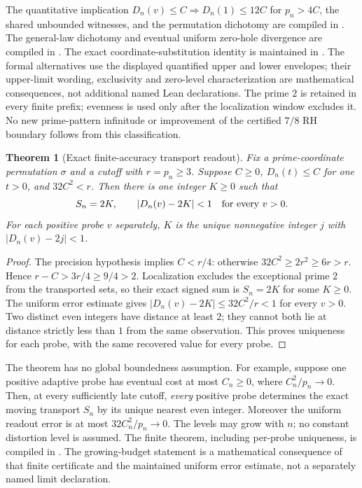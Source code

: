 \documentclass[11pt]{article}
\newtheorem{theorem}{Theorem}[section]
\theoremstyle{definition}
\begin{document}
\begin{flushleft}
The quantitative implication
$D_n(v)\le C\Rightarrow D_n(1)\le12C$ for $p_n>4C$, the shared
unbounded witnesses, and the permutation dichotomy are compiled in
.
The general-law dichotomy and eventual uniform zero-hole divergence are
compiled in .
The exact coordinate-substitution identity is maintained in
.
The formal alternatives use the displayed quantified upper and lower
envelopes; their upper-limit wording, exclusivity and zero-level
characterization are mathematical consequences, not additional named
Lean declarations. The prime $2$ is retained in every finite prefix;
evenness is used only after the localization window excludes it.
No new prime-pattern infinitude or improvement of the certified
$7/8$ RH boundary follows from this classification.
\end{flushleft}

\begin{theorem}[Exact finite-accuracy transport readout]
Fix a prime-coordinate permutation $\sigma$ and a cutoff with $r=p_n\ge3$.
Suppose $C\ge0$, $D_n(t)\le C$ for one $t>0$, and $32C^2<r$.
Then there is one integer $K\ge0$ such that
\[
 S_n=2K,\qquad |D_n(v)-2K|<1\quad\hbox{for every }v>0.
\]
For each positive probe $v$ separately, $K$ is the unique nonnegative
integer $j$ with $|D_n(v)-2j|<1$.
\end{theorem}
\begin{proof}
The precision hypothesis implies $C<r/4$: otherwise
$32C^2\ge2r^2\ge6r>r$. Hence $r-C>3r/4\ge9/4>2$.
Localization excludes the exceptional prime $2$ from the transported
sets, so their exact signed sum is $S_n=2K$ for some $K\ge0$.
The uniform error estimate gives
$|D_n(v)-2K|\le32C^2/r<1$ for every $v>0$.
Two distinct even integers have distance at least $2$; they cannot both
lie at distance strictly less than $1$ from the same observation.
This proves uniqueness for each probe, with the same recovered value
for every probe.
\end{proof}

The theorem has no global boundedness assumption.
For example, suppose one positive adaptive probe has eventual cost at
most $C_n\ge0$, where $C_n^2/p_n\to0$. Then, at every sufficiently late
cutoff, \emph{every} positive probe determines the exact moving transport
$S_n$ by its unique nearest even integer. Moreover the uniform readout
error is at most $32C_n^2/p_n\to0$.
The levels may grow with $n$; no constant distortion level is assumed.
The finite theorem, including per-probe uniqueness, is compiled in
. The growing-budget
statement is a mathematical consequence of that finite certificate and
the maintained uniform error estimate, not a separately named limit
declaration.
\end{document}
